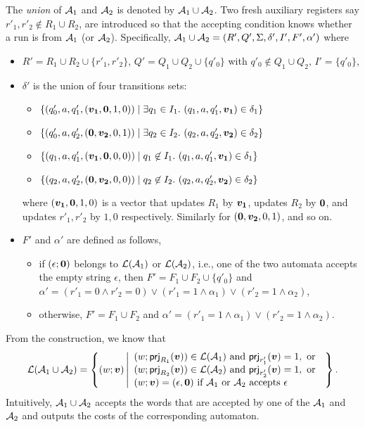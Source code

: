 The \emph{union} of $\mathcal{A}_1$ and $\mathcal{A}_2$ is denoted by $\mathcal{A}_1 \cup \mathcal{A}_2$. Two fresh auxiliary registers say $r'_1,r'_2 \not \in R_1 \cup R_2$, are introduced so that the accepting condition knows whether a run is from $\mathcal{A}_1$ (or $\mathcal{A}_2$). Specifically, $\mathcal{A}_1 \cup \mathcal{A}_2 = (R', Q', \Sigma, \delta', I', F', \alpha')$ where 
\begin{itemize}
\item $R' = R_1 \cup R_2 \cup \{r'_1, r'_2\}$, $Q' = Q_1 \cup Q_2 \cup \{q'_0\}$ with $q'_0 \not \in Q_1 \cup Q_2$, $I' = \{q'_0\}$, 
%
\item $\delta'$ is the union of four transitions sets:
\begin{itemize}
  \item $\{(q'_0, a, q'_1, (\myvec{v_1}, \myvec{0}, 1,0)) \mid \exists q_1 \in I_1.\ (q_1, a, q'_1, \myvec{v_1}) \in \delta_1\}$
  \item $\{(q'_0, a, q'_2, (\myvec{0}, \myvec{v_2}, 0, 1)) \mid \exists q_2 \in I_2.\ (q_2, a, q'_2, \myvec{v_2}) \in \delta_2\}$
  \item $\{(q_1, a, q'_1, (\myvec{v_1}, \myvec{0}, 0, 0)) \mid q_1\not\in I_1.\ (q_1, a, q'_1, \myvec{v_1}) \in \delta_1\}$
  \item $\{(q_2, a, q'_2, (\myvec{0}, \myvec{v_2}, 0, 0)) \mid q_2\not\in I_2.\ (q_2, a, q'_2, \myvec{v_2}) \in \delta_2\}$
\end{itemize}
 where $(\myvec{v_1}, \myvec{0}, 1,0)$ is a vector that updates $R_1$ by $\myvec{v_1}$, updates $R_2$ by $\myvec{0}$, and updates $r'_1,r'_2$ by $1,0$ respectively. Similarly for $(\myvec{0}, \myvec{v_2}, 0, 1)$, and so on.

\item $F'$ and $\alpha'$ are defined as follows, 
\begin{itemize}
\item if $(\epsilon; \myvec{0})$ belongs to $\mathcal{L}(\mathcal{A}_1)$ or $\mathcal{L}(\mathcal{A}_2)$, i.e., one of the two automata accepts the empty string $\epsilon$, then $F' = F_1 \cup F_2 \cup \{q'_0\}$ and $\alpha' = (r'_1 = 0 \wedge r'_2 = 0) \vee (r'_1=1 \wedge \alpha_1) \vee (r'_2=1 \wedge \alpha_2)$, 
\item otherwise, $F'=F_1 \cup F_2$ and $\alpha' = (r'_1=1 \wedge \alpha_1) \vee (r'_2=1 \wedge \alpha_2)$.
\end{itemize}
\end{itemize}
From the construction, we know that 
$$
\Lang(\aut_1 \cup \aut_2) = 
\left\{(w; \myvec{v}) \left \vert 
\begin{array}{l}
(w; \prj_{R_1}(\myvec{v})) \in \Lang(\aut_1) \mbox{ and } \prj_{r_1'}(\myvec{v}) = 1, \mbox{ or } \\
(w; \prj_{R_2}(\myvec{v})) \in \Lang(\aut_2) \mbox{ and } \prj_{r_2'}(\myvec{v}) = 1, \mbox{ or } \\
(w; \myvec{v}) = (\epsilon, \myvec{0}) \mbox{ if } \aut_1 \mbox{ or } \aut_2 \mbox{ accepts } \epsilon
\end{array}
\right.
\right\}.
$$ 
Intuitively, $\mathcal{A}_1 \cup \mathcal{A}_2$ accepts the words that are accepted by one of the $\mathcal{A}_1$ and $\mathcal{A}_2$ and outputs the costs of the corresponding automaton.

